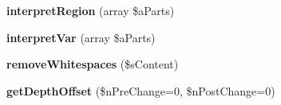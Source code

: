 \begin{DoxyCompactItemize}
\item 
\hypertarget{class_i_p_c_o___parser_abb962eea9cb34309d322662580cb91a6}{{\bfseries interpret\-Region} (array \$a\-Parts)}\label{class_i_p_c_o___parser_abb962eea9cb34309d322662580cb91a6}

\item 
\hypertarget{class_i_p_c_o___parser_ae4ec9cb0e3b568997f939c54e8e8b884}{{\bfseries interpret\-Var} (array \$a\-Parts)}\label{class_i_p_c_o___parser_ae4ec9cb0e3b568997f939c54e8e8b884}

\item 
\hypertarget{class_i_p_c_o___parser_a2c86210b59cbb8374ca3e4ef53a3e270}{{\bfseries remove\-Whitespaces} (\$s\-Content)}\label{class_i_p_c_o___parser_a2c86210b59cbb8374ca3e4ef53a3e270}

\item 
\hypertarget{class_i_p_c_o___parser_a06268d99c7b4560f951652392627dcfd}{{\bfseries get\-Depth\-Offset} (\$n\-Pre\-Change=0, \$n\-Post\-Change=0)}\label{class_i_p_c_o___parser_a06268d99c7b4560f951652392627dcfd}

\end{DoxyCompactItemize}
